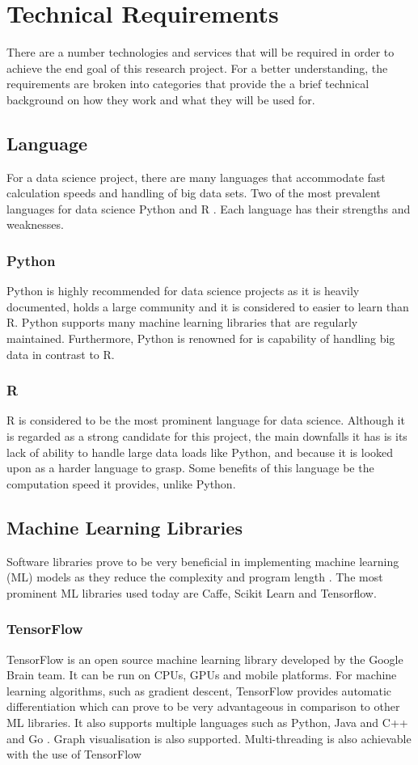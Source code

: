 
\section*{Technical Requirements}
There are a number technologies and services that will be required in order to achieve the end goal of this research project. For a better understanding, the requirements are broken into categories that provide the a brief technical background on how they work and what they will be used for. 

\subsection*{Language}
For a data science project, there are many languages that accommodate fast calculation speeds and handling of big data sets. Two of the most prevalent languages for data science Python and R \citep{frossbytes}. Each language has their strengths and weaknesses.
\subsubsection{Python}
Python is highly recommended for data science projects as it is heavily documented, holds a large community and it is considered to easier to learn than R. Python supports many machine learning libraries that are regularly maintained. Furthermore, Python is renowned for is capability of handling big data in contrast to R.
\subsubsection{R}
R is considered to be the most prominent language for data science. Although it is regarded as a strong candidate for this project, the main downfalls it has is its lack of ability to handle large data loads like Python, and because it is looked upon as a harder language to grasp. Some benefits of this language be the computation speed it provides, unlike Python.

\subsection*{Machine Learning Libraries}
Software libraries prove to be very beneficial in implementing machine learning (ML) models as they reduce the complexity and program length \citep{jain_2017}. The most prominent ML libraries used today are Caffe, Scikit Learn and Tensorflow. 
\subsubsection{TensorFlow}
TensorFlow is an open source machine learning library developed by the Google Brain team. It can be run on CPUs, GPUs and mobile platforms. For machine learning algorithms, such as gradient descent, TensorFlow provides automatic differentiation which can prove to be very advantageous in comparison to other ML libraries. It also supports multiple languages such as Python, Java and C++ and Go \citep{jain_2017}. Graph visualisation is also supported. Multi-threading is also achievable with the use of TensorFlow
